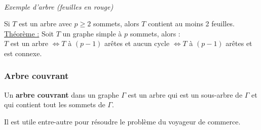 \documentclass[11pt]{article}
\begin{document}
        			\begin{center}
        			 \\
        			\textit{Exemple d'arbre (feuilles en rouge)}
        			\end{center}
        	
        			Si $T$ est un arbre avec $p \geq 2$ sommets, alors $T$ contient au moins 2 feuilles.\\
        				
        			\underline{Théorème :} Soit $T$ un graphe simple à $p$ sommets, alors : \\ 
        			$T$ est un arbre $\Leftrightarrow T$ à $(p-1)$ arêtes et aucun cycle $\Leftrightarrow T$ à $(p-1)$ arêtes et est connexe.
		\subsubsection{Arbre couvrant}
			Un \textbf{arbre couvrant} dans un graphe $\Gamma$ est un arbre qui est un sous-arbre de $\Gamma$ et qui contient tout les sommets de $\Gamma$.
			
			Il est utile entre-autre pour résoudre le problème du voyageur de commerce.
	
\end{document}
